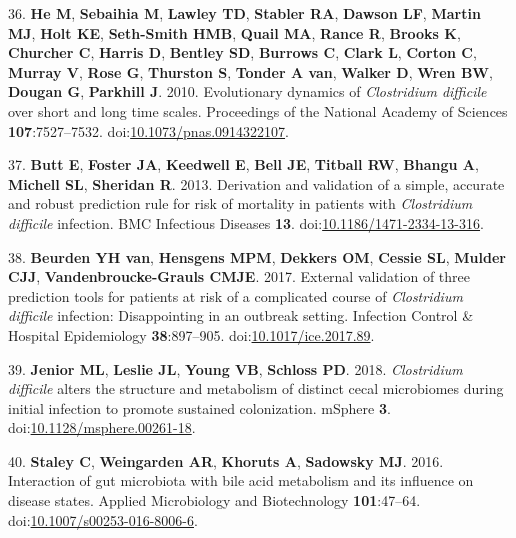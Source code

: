 \documentclass[
  12pt,
]{article}
\newenvironment{cslreferences}%
  {}%
  {\par}
\begin{document}
\begin{cslreferences}
\leavevmode\hypertarget{ref-He2010}{}%
36. \textbf{He M}, \textbf{Sebaihia M}, \textbf{Lawley TD},
\textbf{Stabler RA}, \textbf{Dawson LF}, \textbf{Martin MJ},
\textbf{Holt KE}, \textbf{Seth-Smith HMB}, \textbf{Quail MA},
\textbf{Rance R}, \textbf{Brooks K}, \textbf{Churcher C}, \textbf{Harris
D}, \textbf{Bentley SD}, \textbf{Burrows C}, \textbf{Clark L},
\textbf{Corton C}, \textbf{Murray V}, \textbf{Rose G}, \textbf{Thurston
S}, \textbf{Tonder A van}, \textbf{Walker D}, \textbf{Wren BW},
\textbf{Dougan G}, \textbf{Parkhill J}. 2010. Evolutionary dynamics of
\emph{Clostridium difficile} over short and long time scales.
Proceedings of the National Academy of Sciences \textbf{107}:7527--7532.
doi:\href{https://doi.org/10.1073/pnas.0914322107}{10.1073/pnas.0914322107}.

\leavevmode\hypertarget{ref-Butt2013}{}%
37. \textbf{Butt E}, \textbf{Foster JA}, \textbf{Keedwell E},
\textbf{Bell JE}, \textbf{Titball RW}, \textbf{Bhangu A},
\textbf{Michell SL}, \textbf{Sheridan R}. 2013. Derivation and
validation of a simple, accurate and robust prediction rule for risk of
mortality in patients with \emph{Clostridium difficile} infection. BMC
Infectious Diseases \textbf{13}.
doi:\href{https://doi.org/10.1186/1471-2334-13-316}{10.1186/1471-2334-13-316}.

\leavevmode\hypertarget{ref-vanBeurden2017}{}%
38. \textbf{Beurden YH van}, \textbf{Hensgens MPM}, \textbf{Dekkers OM},
\textbf{Cessie SL}, \textbf{Mulder CJJ}, \textbf{Vandenbroucke-Grauls
CMJE}. 2017. External validation of three prediction tools for patients
at risk of a complicated course of \emph{Clostridium difficile}
infection: Disappointing in an outbreak setting. Infection Control \&
Hospital Epidemiology \textbf{38}:897--905.
doi:\href{https://doi.org/10.1017/ice.2017.89}{10.1017/ice.2017.89}.

\leavevmode\hypertarget{ref-Jenior2018}{}%
39. \textbf{Jenior ML}, \textbf{Leslie JL}, \textbf{Young VB},
\textbf{Schloss PD}. 2018. \emph{Clostridium difficile} alters the
structure and metabolism of distinct cecal microbiomes during initial
infection to promote sustained colonization. mSphere \textbf{3}.
doi:\href{https://doi.org/10.1128/msphere.00261-18}{10.1128/msphere.00261-18}.

\leavevmode\hypertarget{ref-Staley2016}{}%
40. \textbf{Staley C}, \textbf{Weingarden AR}, \textbf{Khoruts A},
\textbf{Sadowsky MJ}. 2016. Interaction of gut microbiota with bile acid
metabolism and its influence on disease states. Applied Microbiology and
Biotechnology \textbf{101}:47--64.
doi:\href{https://doi.org/10.1007/s00253-016-8006-6}{10.1007/s00253-016-8006-6}.


\end{cslreferences}
\end{document}
